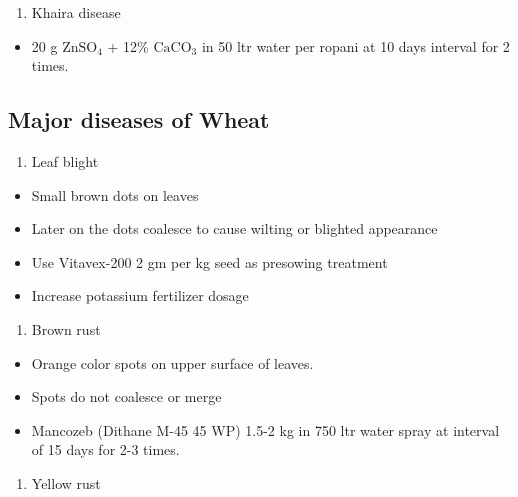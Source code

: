 \documentclass[]{book}
\providecommand{\tightlist}{%
  \setlength{\itemsep}{0pt}\setlength{\parskip}{0pt}}
\begin{document}
\begin{enumerate}
\def\labelenumi{\arabic{enumi}.}
\setcounter{enumi}{5}
\tightlist
\item
  Khaira disease
\end{enumerate}

\begin{itemize}
\tightlist
\item
  20 g \(\mathrm{ZnSO_4}\) + 12\% \(\mathrm{CaCO_3}\) in 50 ltr water per ropani at 10 days interval for 2 times.
\end{itemize}

\hypertarget{major-diseases-of-wheat}{%
\subsection{Major diseases of Wheat}\label{major-diseases-of-wheat}}

\begin{enumerate}
\def\labelenumi{\arabic{enumi}.}
\tightlist
\item
  Leaf blight
\end{enumerate}

\begin{itemize}
\tightlist
\item
  Small brown dots on leaves
\item
  Later on the dots coalesce to cause wilting or blighted appearance
\item
  Use Vitavex-200 2 gm per kg seed as presowing treatment
\item
  Increase potassium fertilizer dosage
\end{itemize}

\begin{enumerate}
\def\labelenumi{\arabic{enumi}.}
\setcounter{enumi}{1}
\tightlist
\item
  Brown rust
\end{enumerate}

\begin{itemize}
\tightlist
\item
  Orange color spots on upper surface of leaves.
\item
  Spots do not coalesce or merge
\item
  Mancozeb (Dithane M-45 45 WP) 1.5-2 kg in 750 ltr water spray at interval of 15 days for 2-3 times.
\end{itemize}

\begin{enumerate}
\def\labelenumi{\arabic{enumi}.}
\setcounter{enumi}{2}
\tightlist
\item
  Yellow rust
\end{enumerate}
\end{document}
